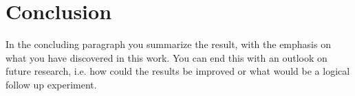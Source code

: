 \section{Conclusion}

In the concluding paragraph you summarize the result, with the
emphasis on what you have discovered in this work. You can end this
with an outlook on future research, i.e. how could the results be
improved or what would be a logical follow up experiment.